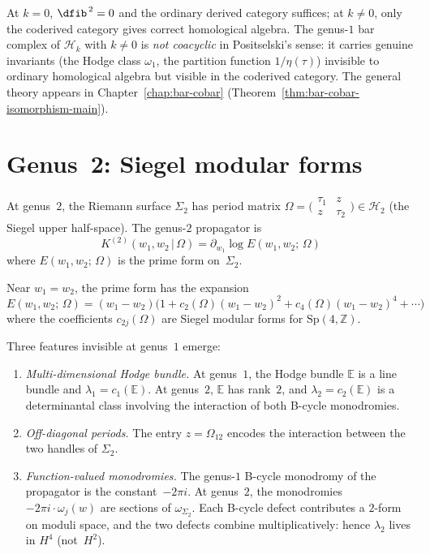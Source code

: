 At $k = 0$, $\dfib^{\,2} = 0$ and the ordinary derived category
suffices; at $k \neq 0$, only the coderived category gives correct
homological algebra. The genus-$1$ bar complex of $\mathcal{H}_k$
with $k \neq 0$ is \emph{not coacyclic} in Positselski's sense: it
carries genuine invariants (the Hodge class $\omega_1$, the partition
function $1/\eta(\tau)$) invisible to ordinary homological algebra but
visible in the coderived category. The general theory appears in
Chapter~\ref{chap:bar-cobar}
(Theorem~\ref{thm:bar-cobar-isomorphism-main}).

\section{Genus~2: Siegel modular forms}\label{sec:frame-genus2}

At genus~$2$, the Riemann surface $\Sigma_2$ has period matrix
$\Omega = \bigl(\begin{smallmatrix} \tau_1 & z \\ z & \tau_2
\end{smallmatrix}\bigr) \in \mathcal{H}_2$ (the Siegel upper
half-space). The genus-$2$ propagator is
\begin{equation}\label{eq:frame-genus2-propagator}
K^{(2)}(w_1, w_2 \,|\, \Omega)
= \partial_{w_1} \log E(w_1, w_2;\, \Omega)
\end{equation}
where $E(w_1, w_2;\, \Omega)$ is the prime form on~$\Sigma_2$.

Near $w_1 = w_2$, the prime form has the expansion
\begin{equation}\label{eq:frame-prime-form-expansion}
E(w_1, w_2;\, \Omega)
= (w_1 - w_2)\bigl(1 + c_2(\Omega)(w_1 - w_2)^2
+ c_4(\Omega)(w_1 - w_2)^4 + \cdots\bigr)
\end{equation}
where the coefficients $c_{2j}(\Omega)$ are Siegel modular forms
for $\mathrm{Sp}(4, \mathbb{Z})$.

Three features invisible at genus~$1$ emerge:
\begin{enumerate}
\item \emph{Multi-dimensional Hodge bundle.}
 At genus~$1$, the Hodge bundle $\mathbb{E}$ is a line bundle and
 $\lambda_1 = c_1(\mathbb{E})$. At genus~$2$, $\mathbb{E}$ has
 rank~$2$, and $\lambda_2 = c_2(\mathbb{E})$ is a determinantal
 class involving the interaction of both B-cycle monodromies.

\item \emph{Off-diagonal periods.}
 The entry $z = \Omega_{12}$ encodes the interaction between the
 two handles of $\Sigma_2$.

\item \emph{Function-valued monodromies.}
 The genus-$1$ B-cycle monodromy of the propagator is the
 constant~$-2\pi i$. At genus~$2$, the monodromies
 $-2\pi i \cdot \omega_j(w)$ are sections of
 $\omega_{\Sigma_2}$. Each B-cycle defect contributes a
 $2$-form on moduli space, and the two defects combine
 multiplicatively: hence $\lambda_2$ lives in $H^4$
 (not~$H^2$).
\end{enumerate}

